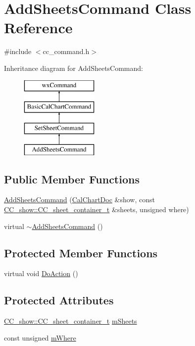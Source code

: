 \hypertarget{a00001}{\section{Add\-Sheets\-Command Class Reference}
\label{a00001}
}


{\ttfamily \#include $<$cc\-\_\-command.\-h$>$}

Inheritance diagram for Add\-Sheets\-Command\-:\begin{figure}[H]
\begin{center}
\leavevmode
\includegraphics[height=4.000000cm]{a00001}
\end{center}
\end{figure}
\subsection*{Public Member Functions}
\begin{DoxyCompactItemize}
\item 
\hyperlink{a00001_ae67e3a5bfc4cce3030f2956d701333ec}{Add\-Sheets\-Command} (\hyperlink{a00020}{Cal\-Chart\-Doc} \&show, const \hyperlink{a00046_a1a6e11ead9a97c796881971059c56f37}{C\-C\-\_\-show\-::\-C\-C\-\_\-sheet\-\_\-container\-\_\-t} \&sheets, unsigned where)
\item 
virtual \hyperlink{a00001_a2cf09716b4570a170eea345640a586eb}{$\sim$\-Add\-Sheets\-Command} ()
\end{DoxyCompactItemize}
\subsection*{Protected Member Functions}
\begin{DoxyCompactItemize}
\item 
virtual void \hyperlink{a00001_aba46cac1335e29189a9aaf5b50d3f364}{Do\-Action} ()
\end{DoxyCompactItemize}
\subsection*{Protected Attributes}
\begin{DoxyCompactItemize}
\item 
\hyperlink{a00046_a1a6e11ead9a97c796881971059c56f37}{C\-C\-\_\-show\-::\-C\-C\-\_\-sheet\-\_\-container\-\_\-t} \hyperlink{a00001_a1e2bbc755b75b02774e83b5e8c1c27f0}{m\-Sheets}
\item 
const unsigned \hyperlink{a00001_a5456fb7e9af34bf953e0e74628d4165d}{m\-Where}
\end{DoxyCompactItemize}


